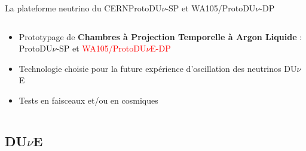 \begin{frame}{La plateforme neutrino du CERN}{ProtoDU$\nu$-SP et WA105/ProtoDU$\nu$-DP}
\begin{columns}
\begin{column}{0.5\textwidth}
\begin{scriptsize}
\begin{itemize}
                        \item Prototypage de \textbf{Chambres à Projection Temporelle à Argon Liquide} : ProtoDU$\nu$-SP et \textcolor{red}{WA105/ProtoDU$\nu$E-DP}
                        \item Technologie choisie pour la future expérience d'oscillation des neutrinos DU$\nu$E
                        \item Tests en faisceaux et/ou en cosmiques
                    \end{itemize}
                \end{scriptsize}
            \end{column}
        \end{columns}
    \end{frame}
        
    \subsection{DU$\nu$E}
        
